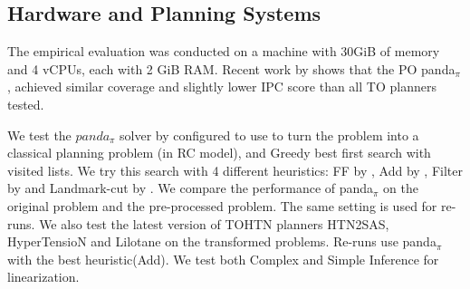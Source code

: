 \documentclass[letterpaper]{article} %
\begin{document}
\subsection{Hardware and Planning Systems}
The empirical evaluation was conducted on a machine with 30GiB of memory and 4 vCPUs, each with 2 GiB RAM. Recent work by \cite{HTN2SAS} shows that the PO panda$_\pi$, achieved similar coverage and slightly lower IPC score than all TO planners tested. %

We test the $panda_{\pi}$ solver by \cite{useClassicalHuristicICAPS18,useClassicalHeuristicIJCAI19,progressionsearchJAIR20} configured to use to turn the problem into a classical planning problem (in RC model), and Greedy best first search with visited lists. We try this search with 4 different heuristics: FF by \cite{FF}, Add by \cite{Add}, Filter by \cite{useClassicalHuristicICAPS18} and Landmark-cut by \cite{LM-Cut}. We compare the performance of panda$_\pi$ on the original problem and the pre-processed problem. The same setting is used for re-runs. We also test the latest version of TOHTN planners HTN2SAS, HyperTensioN and Lilotane on the transformed problems. Re-runs use panda$_{\pi}$ with the best heuristic(Add). 
We test both Complex and Simple Inference for linearization. %
 
\end{document}
